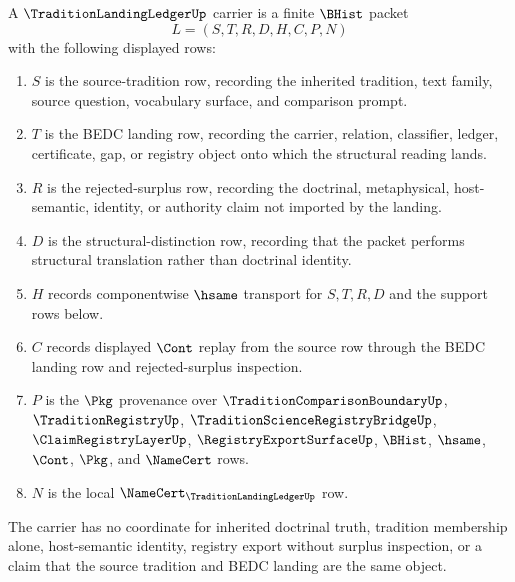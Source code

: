 \begin{definition}
\label{def:tradition-landing-ledger-carrier}
A $\TraditionLandingLedgerUp$ carrier is a finite $\BHist$ packet
$$
L=(S,T,R,D,H,C,P,N)
$$
with the following displayed rows:
\begin{enumerate}
\item $S$ is the source-tradition row, recording the inherited tradition, text family, source question, vocabulary surface, and comparison prompt.
\item $T$ is the BEDC landing row, recording the carrier, relation, classifier, ledger, certificate, gap, or registry object onto which the structural reading lands.
\item $R$ is the rejected-surplus row, recording the doctrinal, metaphysical, host-semantic, identity, or authority claim not imported by the landing.
\item $D$ is the structural-distinction row, recording that the packet performs structural translation rather than doctrinal identity.
\item $H$ records componentwise $\hsame$ transport for $S,T,R,D$ and the support rows below.
\item $C$ records displayed $\Cont$ replay from the source row through the BEDC landing row and rejected-surplus inspection.
\item $P$ is the $\Pkg$ provenance over $\TraditionComparisonBoundaryUp$, $\TraditionRegistryUp$, $\TraditionScienceRegistryBridgeUp$, $\ClaimRegistryLayerUp$, $\RegistryExportSurfaceUp$, $\BHist$, $\hsame$, $\Cont$, $\Pkg$, and $\NameCert$ rows.
\item $N$ is the local $\NameCert_{\TraditionLandingLedgerUp}$ row.
\end{enumerate}
The carrier has no coordinate for inherited doctrinal truth, tradition membership alone, host-semantic identity, registry export without surplus inspection, or a claim that the source tradition and BEDC landing are the same object.
\end{definition}


